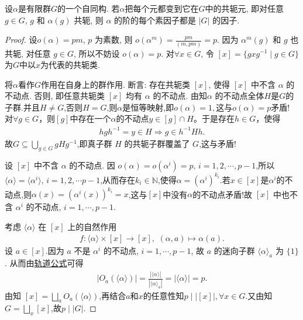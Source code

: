 \documentclass[../../main.tex]{subfiles}%
\begin{document}
\begin{example}
设$\alpha$是有限群$G$的一个自同构. 若$\alpha$把每个元都变到它在$G$中的共轭元, 即对任意$g \in G$, $g$ 和 $\alpha(g)$ 共轭, 则 $\alpha$ 的阶的每个素因子都是 $|G|$ 的因子.
\end{example}
\begin{proof}

设$o(\alpha) = pm$, $p$ 为素数, 则 $o(\alpha^m) = \frac{pm}{(m, pm)} = p$. 因为 $\alpha^m(g)$ 和 $g$ 也共轭, 对任意 $g \in G$, 所以不妨设 $o(\alpha) = p$. 对$\forall x \in G$, 令 $[x] = \{gxg^{-1} \mid g \in G\}$为$G$中以$x$为代表的共轭类.

将$\alpha$看作$G$作用在自身上的群作用.
断言: 存在共轭类 $[x]$, 使得 $[x]$ 中不含 $\alpha$ 的不动点.
否则, 即任意共轭类 $[x]$ 均有 $\alpha$ 的不动点. 由知$\alpha$ 的不动点全体$H$是$G$的子群.并且$H \neq G$,否则$H=G$,则$\alpha$是恒等映射,即$o(\alpha)=1,$这与$o(\alpha)=p$矛盾!
对$\forall g\in G$，则$[g]$中存在一个$\alpha$的不动点$y\in [g]\cap H$。于是存在$h\in G$，使得\begin{align*}
hgh^{-1}=y\in H\Longrightarrow g\in h^{-1}Hh.
\end{align*}
故$G\subseteq \bigcup\limits_{g\in G}gHg^{-1}$,即真子群 $H$ 的共轭子群覆盖了 $G$,这与矛盾!

设 $[x]$ 中不含 $\alpha$ 的不动点. 因 $o(\alpha) =o(\alpha^i)= p,\,i=1,2,\cdots,p-1$,所以$\langle \alpha\rangle=\langle \alpha^i\rangle,\,i=1,2,\cdots p-1$,从而存在$k_i\in \mathbb{N}$,使得$\alpha =(\alpha^i)^{k_i}$.若$x\in [x]$是$\alpha^i$的不动点,则$\alpha(x)=(\alpha^i(x))^{k_i}=x$,这与$[x]$中没有$\alpha$的不动点矛盾!故 $[x]$ 中也不含 $\alpha^i$ 的不动点, $i = 1, \cdots, p-1$. 

考虑 $\langle \alpha \rangle$ 在 $[x]$ 上的自然作用
\begin{align*}
f:\langle \alpha\rangle \times [x]\to [x],\,\,(\alpha,a)\mapsto \alpha(a).
\end{align*}
设 $a \in [x]$.因为 $a$ 不是 $\alpha^i$ 的不动点, $i = 1, \cdots, p-1$, 故 $a$ 的迷向子群 $\langle \alpha \rangle_a$ 为 $\{1\}$. 从而由\hyperref[corollary:有限群轨道的阶与其商掉迷向子群的阶相同]{轨道公式}可得
\begin{align*}
|O_a(\langle \alpha \rangle)| = \frac{|\langle \alpha \rangle|}{|\langle \alpha \rangle_a|} = |\langle \alpha \rangle| = p.
\end{align*}
由知 $[x] = \bigsqcup\limits_{a} O_a(\langle \alpha \rangle)$,再结合$a$和$x$的任意性知$p \mid |[x]|,\forall x\in G$.又由知$G=\bigsqcup\limits_{x}[x]$,故$p\mid |G|$.

\end{proof}
\end{document}
